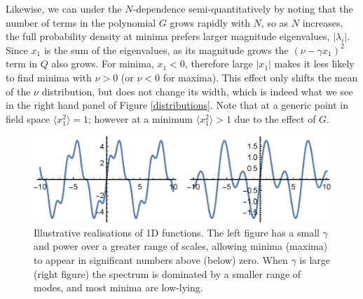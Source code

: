 \documentclass[12pt]{article}
\begin{document}

Likewise, we can under the $N$-dependence semi-quantitatively by noting that the number of terms in the polynomial $G$ grows rapidly with $N$, so as $N$ increases, the full probability density at minima prefers larger magnitude eigenvalues, $|\lambda_i|$. Since $x_1$ is the sum of the eigenvalues, as its magnitude grows the $(\nu-\gamma x_1)^2$ term in $Q$ also grows. For minima, $x_1<0$, therefore large $|x_1|$ makes it less likely to find minima with $\nu >0$ (or $\nu <0 $ for maxima). This effect only shifts the mean of the $\nu$ distribution, but does not change its width, which is indeed what we see in the right hand panel of Figure \ref{distributions}. Note that at a generic point in field space $\langle x_1^2\rangle = 1$; however at a minimum $\langle x_1^2 \rangle >1$ due to the effect of $G$.   


\begin{figure}
  \centering
    \includegraphics[width=\linewidth]{TwoSigmas.eps}
  \caption{Illustrative realisations of 1D functions. The left figure has a small $\gamma$ and power over a greater range of scales, allowing minima (maxima) to appear in significant numbers above (below) zero. When $\gamma$ is large (right figure) the spectrum is dominated by a smaller range of modes, and most minima are low-lying.}
  \label{examples1}
\end{figure}
\end{document}
